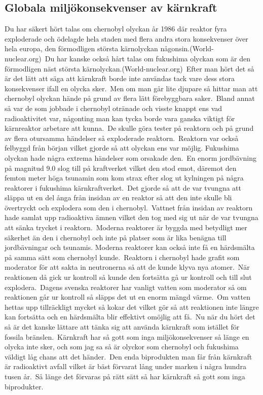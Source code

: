\documentclass[11p]{article}
\begin{document}
    \subsection{Globala miljökonsekvenser av kärnkraft}
    Du har säkert hört talas om chernobyl olyckan år 1986 där reaktor fyra exploderade och ödelagde
    hela staden med flera andra stora konsekvenser över hela europa, den förmodligen största kärnolyckan någonsin.(World-nuclear.org)\
    Du har kanske också hårt talas om fukushima olyckan som är den förmodligen näst största kärnolyckan.(World-nuclear.org)\
    Efter man hört det så är det lätt att säga att kärnkraft borde inte användas tack vare dess stora konsekvenser ifall en olycka sker.\
    Men om man går lite djupare så hittar man att chernobyl olyckan hände på grund av flera lätt förebyggbara saker.\
    Bland annat så var de som jobbade i chernobyl otränade och visste knappt ens vad radioaktivitet var, någonting man
    kan tycka borde vara ganska viktigt för kärnreaktor arbetare att kunna.\ De skulle göra tester på reaktorn och på grund av
    flera otursamma händelser så exploderade reaktorn.\ Reaktorn var också felbyggd från början vilket gjorde så att
    olyckan ens var möjlig.\vspace{0.5cm}
    Fukushima olyckan hade några extrema händelser som orsakade den.\ En enorm jordbävning på magnitud 9.0 slog till på kraftverket vilket
    den stod emot, däremot den femton meter höga tsunamin som kom strax efter slog ut kylningen på några reaktorer i
    fukushima kärnkraftverket.\ Det gjorde så att de var tvungna att släppa ut en del ånga från insidan av en reaktor så att den inte skulle
    bli övertryckt och explodera som den i chernobyl.\ Vattnet från insidan av reaktorn hade samlat upp radioaktiva ämnen vilket den tog
    med sig ut när de var tvungna att sänka trycket i reaktorn.\
    Moderna reaktorer är byggda med betydligt mer säkerhet än den i chernobyl och inte på platser som
    är lika benägna till jordbävningar och tsunamis.\vspace{0.5cm} Moderna reaktorer kan också inte få en härdsmälta på samma sätt
    som chernobyl kunde.\ Reaktorn i chernobyl hade grafit som moderator för att sakta in neutronerna så att de kunde klyva nya atomer.\
    När reaktionen då gick ur kontroll så kunde den fortsätta gå ur kontroll och till slut explodera.\
    Dagens svenska reaktorer har vanligt vatten som moderator så om reaktionen går ur kontroll så släpps det ut en enorm mängd värme.\
    Om vatten hettas upp tillräckligt mycket så kokar det vilket gör så att reaktionen inte längre kan fortsätta och en härdsmälta
    blir effektivt omöjlig att få.\ Nu när du hört det så är det kanske lättare att tänka sig att använda kärnkraft som istället för
    fossila bränslen.\ Kärnkraft har så gott som inga miljökonsekvenser så länge en olycka inte sker, och som jag sa
    så är olyckor som chernobyl och fukushima väldigt låg chans att det händer.\ Den enda biprodukten man får från
    kärnkraft är radioaktivt avfall vilket är bäst förvarat lång under marken i några hundra tusen år.\ Så länge
    det förvaras på rätt sätt så har kärnkraft så gott som inga biprodukter.\
\newpage
\end{document}
